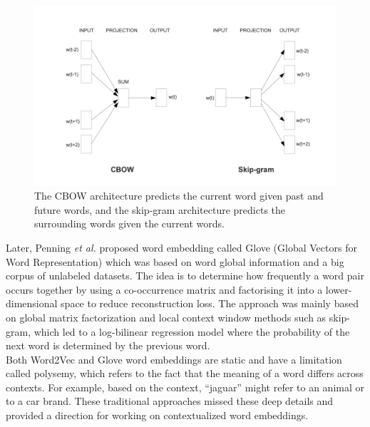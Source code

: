 \documentclass[%
	BCOR=8mm, %
	DIV=12,
	toc=bibliography, %
	toc=listof, %
	oneside, %
	egregdoesnotlikesansseriftitles, %
	]{scrbook}
\begin{document}
\begin{figure}[h!]
    \centering
    \includegraphics[width=0.7\linewidth]{img/cbowandskip.png}
    \caption[Working diagram of CBOW and skip-gram models]{ The CBOW architecture predicts the current word given past and future words, and the skip-gram architecture predicts the surrounding words given the current words.}
    \label{fig:cbow}
\end{figure}
Later, Penning \textit{et al.} \cite{pennington_glove_2014} proposed word embedding called Glove (Global Vectors for Word Representation) which was based on word global information and a big corpus of unlabeled datasets. The idea is to determine how frequently a word pair occurs together by using a co-occurrence matrix and factorising it into a lower-dimensional space to reduce reconstruction loss. The approach was mainly based on global matrix factorization and local context window methods such as skip-gram, which led to a log-bilinear regression model where the probability of the next word is determined by the previous word.\\
 Both Word2Vec and Glove word embeddings are static and have a limitation called polysemy, which refers to the fact that the meaning of a word differs across contexts. For example, based on the context, ``jaguar'' might refer to an animal or to a car brand. These traditional approaches missed these deep details and provided a direction for working on contextualized word embeddings.
\end{document}
